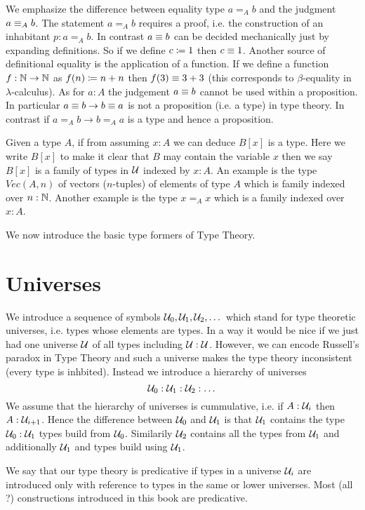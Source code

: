 We emphasize the difference between equality type $a =_A
b$ and the judgment $a \equiv_A b$. The statement $a =_A b$ requires a
proof, i.e. the construction of an inhabitant $p : a =_A b$. In
contrast $a \equiv b$ can be decided mechanically just by expanding
definitions. So if we define $c \coloneqq 1$ then $c\equiv 1$. Another
source of definitional equality is the application of a function. If
we define a function $f : \mathbb{N} \to \mathbb{N}$ as $f(n) \coloneqq n + n$ then
$f(3) \equiv 3+3$ (this corresponds to $\beta$-equality in
$\lambda$-calculus). As for $a : A$ the judgement $a \equiv b$
cannot be used within a proposition. In particular  $a
\equiv b \to b \equiv a$ is not a proposition (i.e. a type) in type theory. In
contrast if $a =_A b \to b =_A a$ is a type and hence a proposition.

Given a type $A$, if from assuming $x:A$ we can deduce $B[x]$ is a type.
Here we write $B[x]$ to make it clear that $B$ may contain the
variable $x$ then we say $B[x]$ is a
family of types in $\mathcal{U}$ indexed by $x:A$. An example is the type $Vec(A,n)$ of
vectors ($n$-tuples) of elements of type $A$ which is family indexed
over $n : \mathbb{N}$. Another example is the type $x =_A x$ which is a
family indexed over $x : A$.

We now introduce the basic type formers of Type Theory.

\section{Universes}
\label{sec:universes}

We introduce a sequence of symbols $\mathcal{U}_0,\mathcal{U}_1,\mathcal{U}_2, \dots$ which
stand for type theoretic universes, i.e. types whose elements are
types. In a way it would be nice if we just had one universe $\mathcal{U}$ of
all types including $\mathcal{U} : \mathcal{U}$. However, we can encode Russell's
paradox in Type Theory and such a universe makes the type theory
inconsistent (every type is inhbited). Instead we introduce a
hierarchy of universes
\[ \mathcal{U}_0 : \mathcal{U}_1 : \mathcal{U}_2 : \dots \]
We assume that the hierarchy of universes is cummulative, i.e. if
$A:\mathcal{U}_i$ then $A : \mathcal{U}_{i+1}$. Hence the difference between
$\mathcal{U}_0$ and $\mathcal{U}_1$ is that $\mathcal{U}_1$ contains the type $\mathcal{U}_0:\mathcal{U}_1$
types build from $\mathcal{U}_0$. Similarily $\mathcal{U}_2$ contains all the types
from $\mathcal{U}_1$ and additionally $\mathcal{U}_1$ and types build using $\mathcal{U}_1$. 

We say that our type theory is predicative if types in a universe
$\mathcal{U}_i$ are introduced only with reference to types in the same or
lower universes. Most (all ?) constructions introduced in this book
are predicative. 

